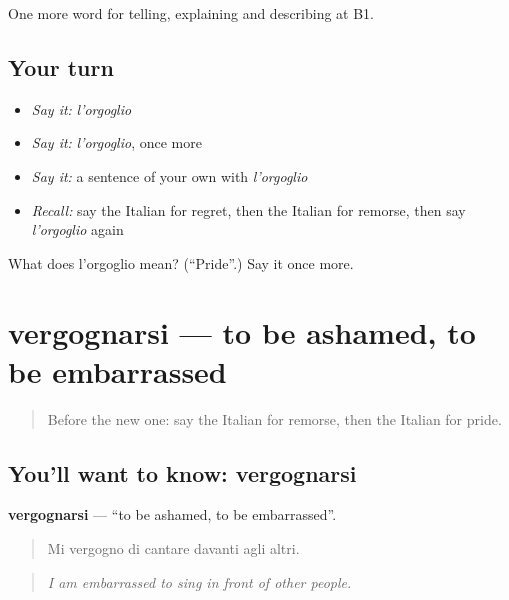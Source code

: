\begin{grammarlens}[title={What you've built}]
One more word for telling, explaining and describing at B1.
\end{grammarlens}

\subsection*{Your turn}
\begin{itemize}
\raggedright
  \item \emph{Say it:} \emph{l'orgoglio}
  \item \emph{Say it:} \emph{l'orgoglio}, once more
  \item \emph{Say it:} a sentence of your own with \emph{l'orgoglio}
  \item \emph{Recall:} say the Italian for regret, then the Italian for remorse, then say \emph{l'orgoglio} again
\end{itemize}

\begin{tcolorbox}[breakable,colback=teal!4,colframe=teal!35!black,title={Before you move on}]
What does l'orgoglio mean? (\textquotedblleft{}Pride\textquotedblright{}.) Say it once more.
\end{tcolorbox}
\section[vergognarsi]{vergognarsi — to be ashamed, to be embarrassed}

\label{lesson:IT-C478-vergognarsi}



\begin{quote}
Before the new one: say the Italian for remorse, then the Italian for pride.
\end{quote}

\subsection*{You'll want to know: vergognarsi}
\textbf{vergognarsi} — \textquotedblleft{}to be ashamed, to be embarrassed\textquotedblright{}.

\begin{quote}
Mi vergogno di cantare davanti agli altri.
\end{quote}

\begin{quote}
\emph{I am embarrassed to sing in front of other people.}
\end{quote}

